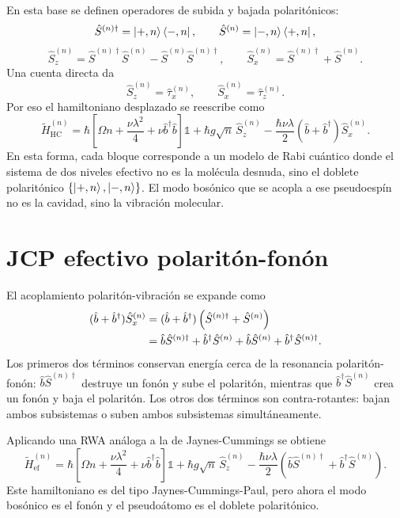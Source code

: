 \documentclass[11pt]{article}
\newcommand{\bdag}{\hat b^\dagger}
\begin{document}
En esta base se definen operadores de subida y bajada polarit\'onicos:
\begin{equation}
  \hat S^{(n)\dagger}=\ket{+,n}\bra{-,n},
  \qquad
  \hat S^{(n)}=\ket{-,n}\bra{+,n},
\end{equation}
\begin{equation}
  \hat S_z^{(n)}
  =
  \hat S^{(n)\dagger}\hat S^{(n)}
  -
  \hat S^{(n)}\hat S^{(n)\dagger},
  \qquad
  \hat S_x^{(n)}
  =
  \hat S^{(n)\dagger}+\hat S^{(n)}.
\end{equation}
Una cuenta directa da
\begin{equation}
  \hat S_z^{(n)}=\hat\tau_x^{(n)},
  \qquad
  \hat S_x^{(n)}=\hat\tau_z^{(n)}.
\end{equation}
Por eso el hamiltoniano desplazado se reescribe como
\begin{equation}
  \boxed{
  \tilde H_{\mathrm{HC}}^{(n)}
  =
  \hbar
  \left[
  \Omega n+\frac{\nu\lambda^2}{4}
  +
  \nu\bdag\hat b
  \right]\mathds{1}
  +
  \hbar g\sqrt n\,\hat S_z^{(n)}
  -
  \frac{\hbar\nu\lambda}{2}(\hat b+\bdag)\hat S_x^{(n)}.
  }
\end{equation}
En esta forma, cada bloque corresponde a un modelo de Rabi cu\'antico donde el
sistema de dos niveles efectivo no es la mol\'ecula desnuda, sino el doblete
polarit\'onico $\{\ket{+,n},\ket{-,n}\}$. El modo bos\'onico que se acopla a
ese pseudoesp\'in no es la cavidad, sino la vibraci\'on molecular.

\section{JCP efectivo polarit\'on-fon\'on}

El acoplamiento polarit\'on-vibraci\'on se expande como
\begin{align}
  (\hat b+\bdag)\hat S_x^{(n)}
  &=
  (\hat b+\bdag)
  \left(\hat S^{(n)\dagger}+\hat S^{(n)}\right)
  \notag\\
  &=
  \hat b\hat S^{(n)\dagger}
  +
  \bdag\hat S^{(n)}
  +
  \hat b\hat S^{(n)}
  +
  \bdag\hat S^{(n)\dagger}.
\end{align}
Los primeros dos t\'erminos conservan energ\'ia cerca de la resonancia
polarit\'on-fon\'on: $\hat b\hat S^{(n)\dagger}$ destruye un fon\'on y sube el
polarit\'on, mientras que $\bdag\hat S^{(n)}$ crea un fon\'on y baja el
polarit\'on. Los otros dos t\'erminos son contra-rotantes: bajan ambos
subsistemas o suben ambos subsistemas simult\'aneamente.

Aplicando una RWA an\'aloga a la de Jaynes-Cummings se obtiene
\begin{equation}
  \boxed{
  \tilde H_{\mathrm{ef}}^{(n)}
  =
  \hbar
  \left[
  \Omega n+\frac{\nu\lambda^2}{4}
  +
  \nu\bdag\hat b
  \right]\mathds{1}
  +
  \hbar g\sqrt n\,\hat S_z^{(n)}
  -
  \frac{\hbar\nu\lambda}{2}
  \left(
  \hat b\hat S^{(n)\dagger}
  +
  \bdag\hat S^{(n)}
  \right).
  }
\end{equation}
Este hamiltoniano es del tipo Jaynes-Cummings-Paul, pero ahora el modo
bos\'onico es el fon\'on y el pseudo\'atomo es el doblete polarit\'onico.
\end{document}
